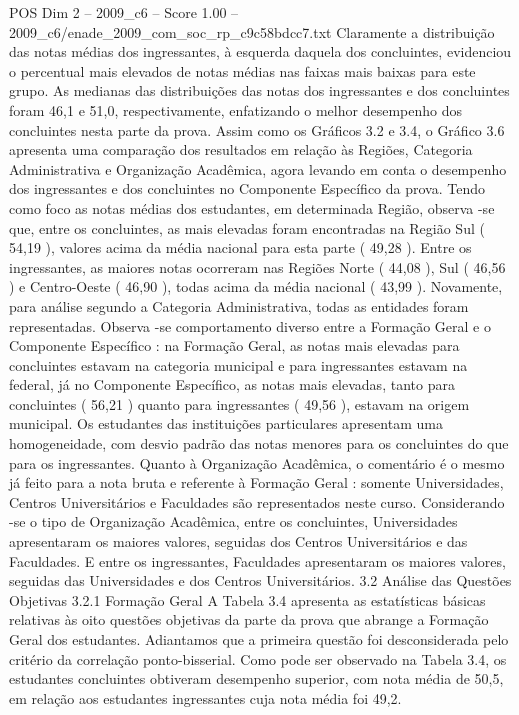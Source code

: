 \begin{textsample}{POS Dim 2 – 2009\_c6 – Score 1.00 – 2009\_c6/enade\_2009\_com\_soc\_rp\_c9c58bdcc7.txt}
Claramente a distribuição das notas médias dos ingressantes, à esquerda daquela dos concluintes, evidenciou o percentual mais elevados de notas médias nas faixas mais baixas para este grupo.
As medianas das distribuições das notas dos ingressantes e dos concluintes foram 46,1 e 51,0, respectivamente, enfatizando o melhor desempenho dos concluintes nesta parte da prova.
Assim como os Gráficos 3.2 e 3.4, o Gráfico 3.6 apresenta uma comparação dos resultados em relação às Regiões, Categoria Administrativa e Organização Acadêmica, agora levando em conta o desempenho dos ingressantes e dos concluintes no Componente Específico da prova.
Tendo como foco as notas médias dos estudantes, em determinada Região, observa -se que, entre os concluintes, as mais elevadas foram encontradas na Região Sul ( 54,19 ), valores acima da média nacional para esta parte ( 49,28 ).
Entre os ingressantes, as maiores notas ocorreram nas Regiões Norte ( 44,08 ), Sul ( 46,56 ) e Centro-Oeste ( 46,90 ), todas acima da média nacional ( 43,99 ).
Novamente, para análise segundo a Categoria Administrativa, todas as entidades foram representadas.
Observa -se comportamento diverso entre a Formação Geral e o Componente Específico : na Formação Geral, as notas mais elevadas para concluintes estavam na categoria municipal e para ingressantes estavam na federal, já no Componente Específico, as notas mais elevadas, tanto para concluintes ( 56,21 ) quanto para ingressantes ( 49,56 ), estavam na origem municipal.
Os estudantes das instituições particulares apresentam uma homogeneidade, com desvio padrão das notas menores para os concluintes do que para os ingressantes.
Quanto à Organização Acadêmica, o comentário é o mesmo já feito para a nota bruta e referente à Formação Geral : somente Universidades, Centros Universitários e Faculdades são representados neste curso.
Considerando -se o tipo de Organização Acadêmica, entre os concluintes, Universidades apresentaram os maiores valores, seguidas dos Centros Universitários e das Faculdades.
E entre os ingressantes, Faculdades apresentaram os maiores valores, seguidas das Universidades e dos Centros Universitários. 3.2 Análise das Questões Objetivas 3.2.1 Formação Geral A Tabela 3.4 apresenta as estatísticas básicas relativas às oito questões objetivas da parte da prova que abrange a Formação Geral dos estudantes.
Adiantamos que a primeira questão foi desconsiderada pelo critério da correlação ponto-bisserial.
Como pode ser observado na Tabela 3.4, os estudantes concluintes obtiveram desempenho superior, com nota média de 50,5, em relação aos estudantes ingressantes cuja nota média foi 49,2.

\end{textsample}
